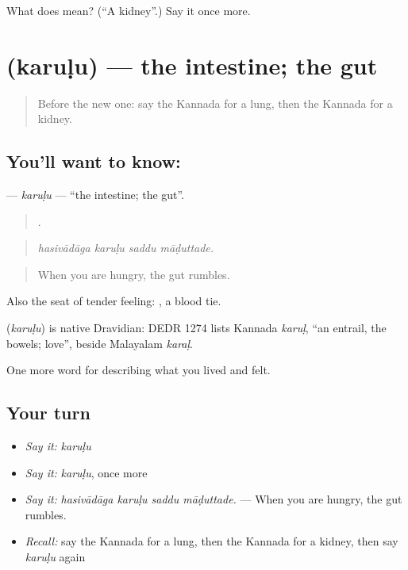 \begin{tcolorbox}[breakable,colback=teal!4,colframe=teal!35!black,title={Before you move on}]
What does  mean? (\textquotedblleft{}A kidney\textquotedblright{}.) Say it once more.
\end{tcolorbox}
\section[\texorpdfstring{\kn{ಕರುಳು} (karuḷu)}{ಕರುಳು (karuḷu)}]{ (karuḷu) — the intestine; the gut}

\label{lesson:KA-C508-karulu}



\begin{quote}
Before the new one: say the Kannada for a lung, then the Kannada for a kidney.
\end{quote}

\subsection*{You'll want to know: }
\textbf{} — \emph{karuḷu} — \textquotedblleft{}the intestine; the gut\textquotedblright{}.

\begin{quote}
   .
\end{quote}

\begin{quote}
\emph{hasivādāga karuḷu saddu māḍuttade.}
\end{quote}

\begin{quote}
When you are hungry, the gut rumbles.
\end{quote}

Also the seat of tender feeling:  , a blood tie.

\begin{cousinweb}
\textbf{} (\emph{karuḷu}) is native Dravidian: DEDR 1274 lists Kannada \emph{karuḷ}, \textquotedblleft{}an entrail, the bowels; love\textquotedblright{}, beside Malayalam \emph{karaḷ}.
\end{cousinweb}

\begin{grammarlens}[title={What you've built}]
One more word for describing what you lived and felt.
\end{grammarlens}

\subsection*{Your turn}
\begin{itemize}
\raggedright
  \item \emph{Say it:} \emph{karuḷu}
  \item \emph{Say it:} \emph{karuḷu}, once more
  \item \emph{Say it:} \emph{hasivādāga karuḷu saddu māḍuttade.} — When you are hungry, the gut rumbles.
  \item \emph{Recall:} say the Kannada for a lung, then the Kannada for a kidney, then say \emph{karuḷu} again
\end{itemize}

